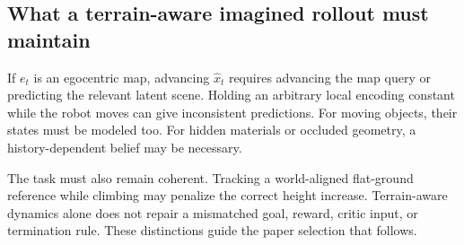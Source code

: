 \subsection{What a terrain-aware imagined rollout must maintain}
If $e_t$ is an egocentric map, advancing $\hat x_t$ requires advancing the map
query or predicting the relevant latent scene. Holding an arbitrary local
encoding constant while the robot moves can give inconsistent predictions.
For moving objects, their states must be modeled too. For hidden materials or
occluded geometry, a history-dependent belief may be necessary.

The task must also remain coherent. Tracking a world-aligned flat-ground
reference while climbing may penalize the correct height increase. Terrain-aware
dynamics alone does not repair a mismatched goal, reward, critic input, or
termination rule. These distinctions guide the paper selection that follows.
